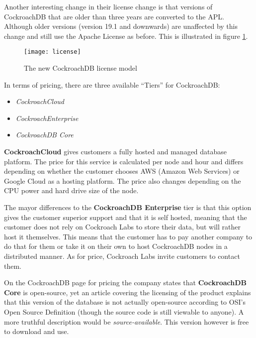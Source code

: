 \medskip
Another interesting change in their license change is that versions of CockroachDB that are older than three years are converted to the APL. Although older versions (version 19.1 and downwards) are unaffected by this change and still use the Apache License as before. This is illustrated in figure \ref{fig:license}.

\begin{figure}[H]
    \texttt{[image: license]}
    \caption{The new CockroachDB license model\cite{cockroach-license}}
    \label{fig:license}
\end{figure}


\bigskip
In terms of pricing, there are three available \enquote{Tiers} for CockroachDB:
\begin{itemize}
    \item \emph{CockroachCloud}
	\item \emph{CockroachEnterprise}
	\item \emph{CockroachDB Core}
\end{itemize}

\textbf{CockroachCloud} gives customers a fully hosted and managed database platform. 
The price for this service is calculated per node and hour and differs depending on whether the customer chooses AWS (Amazon Web Services) or Google Cloud as a hosting platform.
The price also changes depending on the CPU power and hard drive size of the node.
\cite{cockroach-pricing}

\medskip
The mayor differences to the \textbf{CockroachDB Enterprise} tier is that this option gives the customer superior support and that it is self hosted, meaning that the customer does not rely on Cockroach Labs to store their data, but will rather host it themselves. This means that the customer has to pay another company to do that for them or take it on their own to host CockroachDB nodes in a distributed manner.
As for price, Cockroach Labs invite customers to contact them.
\cite{cockroach-pricing}

\medskip
On the CockroachDB page for pricing the company states that \textbf{CockroachDB Core} is open-source,\cite{cockroach-pricing} yet an article covering the licensing of the product explains that this version of the database is not actually open-source according to OSI’s Open Source Definition (though the source code is still viewable to anyone).\cite{cockroach-license}
A more truthful description would be \emph{source-available}.
This version however is free to download and use. 

